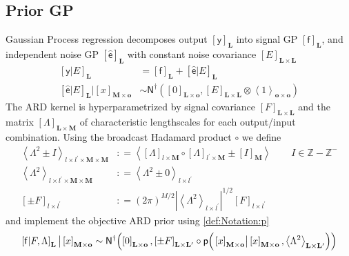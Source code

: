 \documentclass[preprint,12pt]{elsarticle}
\newcommand*{\M}[1]{\ensuremath{#1}\xspace}
\newcommand*{\x}{\times}
\newcommand*{\mi}[1]{\mathbf{#1}}
\newcommand*{\st}[1]{\mathbb{#1}}
\newcommand*{\rv}[1]{\mathsf{#1}}
\newcommand*{\te}[2][]{\left\lbrack{#2}\right\rbrack_{#1}}
\newcommand*{\diag}[2][]{\left\langle{#2}\right\rangle_{#1}}
\newcommand*{\prob}[3]{\M{\mathsf{p}\!\left(\left.{#1}\right\vert{#2,#3}\right)}}
\newcommand*{\deq}{\M{\mathrel{\mathop:}=}}
\newcommand*{\gaussd}[2]{\mathsf{N}^{\dagger}\!\left({#1,#2}\right)}
\newcommand*{\modulus}[1]{\M{\left\lvert{#1}\right\rvert}}
\begin{document}
    \subsection{Prior GP} \label{sub:GP:Prior}
        Gaussian Process regression decomposes output $\te[\mi{L}]{\rv{y}}$ into signal GP $\te[\mi{L}]{\rv{f}}$, and independent noise GP $\te[\mi{L}]{\rv{\hat{e}}}$ with constant noise covariance $\te[\mi{L}\x\mi{L}]{E}$
        \begin{equation*}
            \begin{aligned}
                \te[\mi{L}]{\rv{y}\vert E} 
                &= \te[\mi{L}]{\rv{f}} + \te[\mi{L}]{\rv{\hat{e}}\vert E} \\
                \te[\mi{L}]{\rv{\hat{e}}\vert E} \big\vert \te[\mi{M}\x\mi{o}]{x}
                &\sim \gaussd{\te[\mi{L}\x\mi{o}]{0}}{\te[\mi{L}\x\mi{L}]{E} \otimes \diag[\mi{o}\x\mi{o}]{1}}
            \end{aligned}
        \end{equation*}
        The ARD kernel is hyperparametrized by signal covariance $\te[\mi{L}\x\mi{L}]{F}$ and the matrix $\te[\mi{L}\x\mi{M}]{\Lambda}$ of characteristic lengthscales for each output/input combination. 
        Using the broadcast Hadamard product $\circ$ we define
        \begin{equation*}
            \begin{aligned}
                \diag[l\x l^{\prime}\x\mi{M}\x\mi{M}]{\Lambda^{2} \pm I} 
                &\deq \diag{\te[l\x\mi{M}]{\Lambda} \circ \te[l^{\prime}\x\mi{M}]{\Lambda} \pm \te[\mi{M}]{I}} 
                \qquad I \in \st{Z}-\st{Z}^{-} \\
                \diag[l\x l^{\prime}\x\mi{M}\x\mi{M}]{\Lambda^{2}} &\deq 
                \diag[l\x l^{\prime}]{\Lambda^{2} \pm 0} \\
                    \te[l\x l^{\prime}]{\pm F} 
                &\deq (2 \pi)^{M/2} \modulus{\diag[l\x l^{\prime}]{\Lambda^{2}}}^{1/2} \te[l\x l^{\prime}]{F}
            \end{aligned}
        \end{equation*}
        and implement the objective ARD prior using \cref{def:Notation:p}
        \begin{equation*}
            \te[\mi{L}]{\rv{f} \vert F,\Lambda}
            \big\vert \te[\mi{M}\x\mi{o}]{x} \sim \\
            \gaussd{\te[\mi{L}\x\mi{o}]{0}}{\te[\mi{L}\x\mi{L^{\prime}}]{\pm F} \circ 
            \prob{\te[\mi{M}\x\mi{o}]{x}}{\te[\mi{M}\x\mi{o}]{x}}
            {\diag[\mi{L}\x\mi{L^{\prime}}]{\Lambda^{2}}}} 
        \end{equation*}
        
\end{document}
